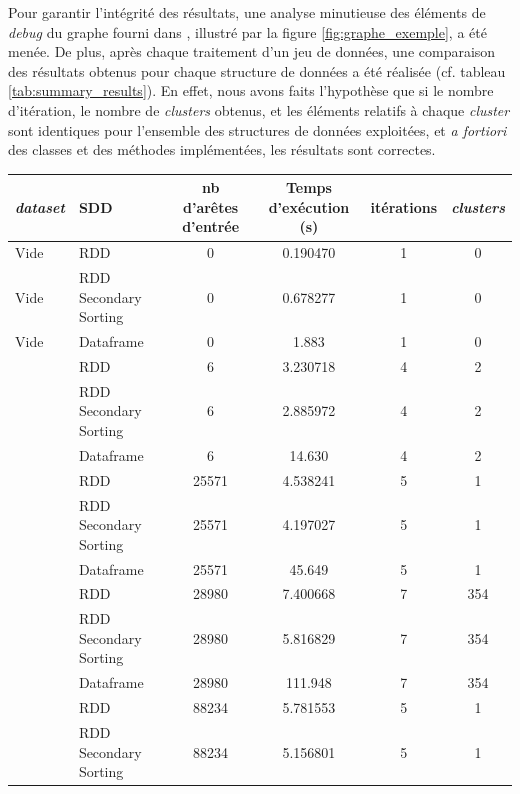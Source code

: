 \documentclass[conference]{IEEEtran}
\begin{document}
Pour garantir l'intégrité des résultats, une analyse minutieuse des éléments de \textit{debug} du graphe fourni dans \cite{6785473}, illustré par la figure \ref{fig:graphe_exemple}, a été menée. De plus, après chaque traitement d'un jeu de données, une comparaison des résultats obtenus pour chaque structure de données a été réalisée (cf. tableau \ref{tab:summary_results}). En effet, nous avons faits l'hypothèse que si le nombre d'itération, le nombre de \textit{clusters} obtenus, et les éléments relatifs à chaque \textit{cluster} sont identiques pour l'ensemble des structures de données exploitées, et \textit{a fortiori} des classes et des méthodes implémentées, les résultats sont correctes.

\begin{minipage}[t]{\columnwidth}
\centering
\tiny
{}
\label{tab:summary_results}
\begin{tabular}{@{}llcccc@{}}
\toprule
\textbf{\textit{dataset}} & \textbf{SDD} & \textbf{nb d'arêtes d'entrée} & \textbf{Temps d'exécution (s)} & \textbf{itérations} & \textbf{\textit{clusters}} \\ \midrule
Vide & RDD & 0 & 0.190470 & 1 & 0 \\
Vide & RDD Secondary Sorting & 0 & 0.678277 & 1 & 0 \\
Vide & Dataframe & 0 & 1.883 & 1 & 0 \\
\cite{6785473} & RDD & 6 & 3.230718 & 4 & 2 \\
\cite{6785473} & RDD Secondary Sorting & 6 & 2.885972 & 4 & 2 \\
\cite{6785473} & Dataframe & 6 & 14.630 & 4 & 2 \\
\cite{email_eu_core} & RDD & 25571 & 4.538241 & 5 & 1 \\
\cite{email_eu_core} & RDD Secondary Sorting & 25571 & 4.197027 & 5 & 1 \\
\cite{email_eu_core} & Dataframe & 25571 & 45.649 & 5 & 1 \\
\cite{ca_grqc} & RDD & 28980 & 7.400668 & 7 & 354 \\
\cite{ca_grqc} & RDD Secondary Sorting & 28980 & 5.816829 & 7 & 354 \\
\cite{ca_grqc} & Dataframe & 28980 & 111.948 & 7 & 354 \\
\cite{facebook_combined} & RDD & 88234 & 5.781553 & 5 & 1 \\
\cite{facebook_combined} & RDD Secondary Sorting & 88234 & 5.156801 & 5 & 1 \\

\end{tabular}
\end{minipage}
\end{document}
